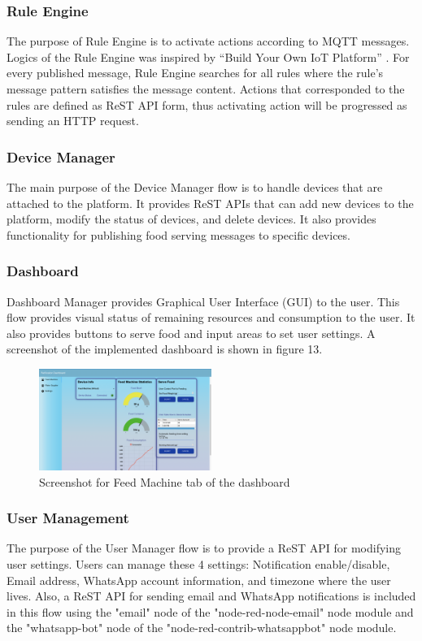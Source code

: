 ﻿\documentclass[conference]{IEEEtran}
\begin{document}
\subsubsection{Rule Engine}
The purpose of Rule Engine is to activate actions according to MQTT messages.
Logics of the Rule Engine was inspired by “Build Your Own IoT Platform” \cite{b22}.
For every published message, Rule Engine searches for all rules where the rule’s message pattern satisfies the message content.
Actions that corresponded to the rules are defined as ReST API form, thus activating action will be progressed as sending an HTTP request.

\subsubsection{Device Manager}
The main purpose of the Device Manager flow is to handle devices that are attached to the platform.
It provides ReST APIs that can add new devices to the platform, modify the status of devices, and delete devices.
It also provides functionality for publishing food serving messages to specific devices.

\subsubsection{Dashboard}
Dashboard Manager provides Graphical User Interface (GUI) to the user.
This flow provides visual status of remaining resources and consumption to the user.
It also provides buttons to serve food and input areas to set user settings. A screenshot of the implemented dashboard is shown in figure 13.

\begin{figure}[htbp]
\centerline{\includegraphics[width=0.5\textwidth]{./images/feed_machine_ui.png}}
\caption{Screenshot for Feed Machine tab of the dashboard}
\label{fig}
\end{figure}

\subsubsection{User Management}
The purpose of the User Manager flow is to provide a ReST API for modifying user settings.
Users can manage these 4 settings: Notification enable/disable, Email address, WhatsApp account information, and timezone where the user lives.
Also, a ReST API for sending email and WhatsApp notifications is included in this flow using the "email" node of the "node-red-node-email" node module and the "whatsapp-bot" node of the "node-red-contrib-whatsappbot" node module.
\end{document}
